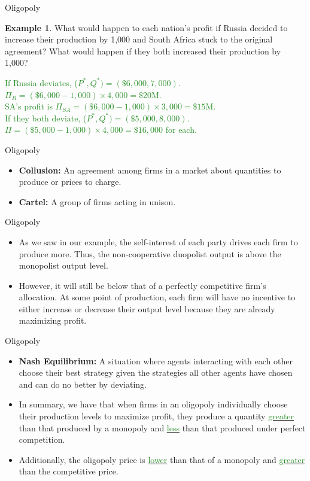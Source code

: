 \documentclass[xcolor={dvipsnames},pdf, hyperref={colorlinks=true, citecolor=ForestGreen, linkcolor=BlueViolet, urlcolor=Magenta}, handout]{beamer}
\theoremstyle{definition}
\newtheorem{exmp}{Example}[section]
\newcommand{\defn}[1]{\textbf{#1}}
\newcommand{\ddp}[1]{{\textcolor{ForestGreen}{#1}}}
\newcommand{\dd}[1]{{\underline{\textcolor{ForestGreen}{#1}}}}
\begin{document}
\begin{frame}{Oligopoly}
	\begin{exmp}
	What would happen to each nation's profit if Russia decided to increase their production by 1,000 and South Africa stuck to the original agreement? What would happen if they both increased their production by 1,000?
\end{exmp}

\ddp{If Russia deviates, ($P^*,Q^*) = (\$6,000, 7,000)$. $\Pi_R = (\$6,000 - 1,000) \times 4,000 = \$20$M. \\
	SA's profit is $\Pi_{SA} = (\$6,000 - 1,000) \times 3,000 = \$15$M. \\ If they both deviate,  ($P^*,Q^*) = (\$5,000, 8,000)$. $\Pi = (\$5,000 - 1,000) \times 4,000 = \$16,000$ for each.}

\end{frame}

\begin{frame}{Oligopoly}
\begin{itemize}
	\item 	\defn{Collusion:} An agreement among firms in a market about quantities to produce or prices to charge.
	\item \defn{Cartel:} A group of firms acting in unison.

\end{itemize}
\end{frame}

\begin{frame}{Oligopoly}
	\begin{itemize}

		\item As we saw in our example, the self-interest of each party drives each firm to produce more. Thus, the non-cooperative duopolist output is above the monopolist output level. 
		\item However, it will still be below that of a perfectly competitive firm's allocation. At some point of production, each firm will have no incentive to either increase or decrease their output level because they are already maximizing profit. 
		
	\end{itemize}
\end{frame}

\begin{frame}{Oligopoly}
\begin{itemize}
	\item \defn{Nash Equilibrium:} A situation where agents interacting with each other choose their best strategy given the strategies all other agents have chosen and can do no better by deviating.
	\item In summary, we have that when firms in an oligopoly individually choose their production levels to maximize profit, they produce a quantity \dd{greater} than that produced by a monopoly and \dd{less} than that produced under perfect competition. 
	\item Additionally, the oligopoly price is \dd{lower} than that of a monopoly and \dd{greater} than the competitive price.
\end{itemize}
\end{frame}
\end{document}
